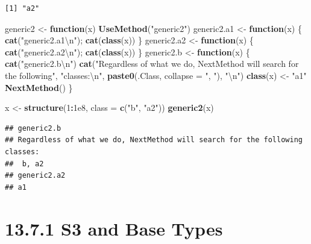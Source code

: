 \documentclass[]{book}
\newenvironment{Shaded}{\begin{snugshade}}{\end{snugshade}}
\newcommand{\CharTok}[1]{\textcolor[rgb]{0.31,0.60,0.02}{#1}}
\newcommand{\ControlFlowTok}[1]{\textcolor[rgb]{0.13,0.29,0.53}{\textbf{#1}}}
\newcommand{\DataTypeTok}[1]{\textcolor[rgb]{0.13,0.29,0.53}{#1}}
\newcommand{\DecValTok}[1]{\textcolor[rgb]{0.00,0.00,0.81}{#1}}
\newcommand{\FloatTok}[1]{\textcolor[rgb]{0.00,0.00,0.81}{#1}}
\newcommand{\KeywordTok}[1]{\textcolor[rgb]{0.13,0.29,0.53}{\textbf{#1}}}
\newcommand{\NormalTok}[1]{#1}
\newcommand{\OperatorTok}[1]{\textcolor[rgb]{0.81,0.36,0.00}{\textbf{#1}}}
\newcommand{\StringTok}[1]{\textcolor[rgb]{0.31,0.60,0.02}{#1}}
\begin{document}
\begin{verbatim}
[1] "a2"
\end{verbatim}

\begin{Shaded}
\begin{Highlighting}[]
\NormalTok{generic2 <-}\StringTok{ }\ControlFlowTok{function}\NormalTok{(x) }\KeywordTok{UseMethod}\NormalTok{(}\StringTok{"generic2"}\NormalTok{)}
\NormalTok{generic2.a1 <-}\StringTok{ }\ControlFlowTok{function}\NormalTok{(x) \{ }\KeywordTok{cat}\NormalTok{(}\StringTok{"generic2.a1}\CharTok{\textbackslash{}n}\StringTok{"}\NormalTok{); }\KeywordTok{cat}\NormalTok{(}\KeywordTok{class}\NormalTok{(x)) \}}
\NormalTok{generic2.a2 <-}\StringTok{ }\ControlFlowTok{function}\NormalTok{(x) \{ }\KeywordTok{cat}\NormalTok{(}\StringTok{"generic2.a2}\CharTok{\textbackslash{}n}\StringTok{"}\NormalTok{); }\KeywordTok{cat}\NormalTok{(}\KeywordTok{class}\NormalTok{(x)) \}}
\NormalTok{generic2.b <-}\StringTok{ }\ControlFlowTok{function}\NormalTok{(x) \{}
  \KeywordTok{cat}\NormalTok{(}\StringTok{"generic2.b}\CharTok{\textbackslash{}n}\StringTok{"}\NormalTok{)}
  \KeywordTok{cat}\NormalTok{(}\StringTok{"Regardless of what we do, NextMethod will search for the following"}\NormalTok{, }
      \StringTok{"classes:}\CharTok{\textbackslash{}n}\StringTok{"}\NormalTok{, }\KeywordTok{paste0}\NormalTok{(.Class, }\DataTypeTok{collapse =} \StringTok{", "}\NormalTok{), }\StringTok{"}\CharTok{\textbackslash{}n}\StringTok{"}\NormalTok{)}
  \KeywordTok{class}\NormalTok{(x) <-}\StringTok{ "a1"}
  \KeywordTok{NextMethod}\NormalTok{()}
\NormalTok{\}}

\NormalTok{x <-}\StringTok{ }\KeywordTok{structure}\NormalTok{(}\DecValTok{1}\OperatorTok{:}\FloatTok{1e8}\NormalTok{, }\DataTypeTok{class =} \KeywordTok{c}\NormalTok{(}\StringTok{"b"}\NormalTok{, }\StringTok{"a2"}\NormalTok{))}
\KeywordTok{generic2}\NormalTok{(x)}
\end{Highlighting}
\end{Shaded}

\begin{verbatim}
## generic2.b
## Regardless of what we do, NextMethod will search for the following classes:
##  b, a2 
## generic2.a2
## a1
\end{verbatim}

\hypertarget{s3-and-base-types}{%
\section*{13.7.1 S3 and Base Types}\label{s3-and-base-types}}
\end{document}
